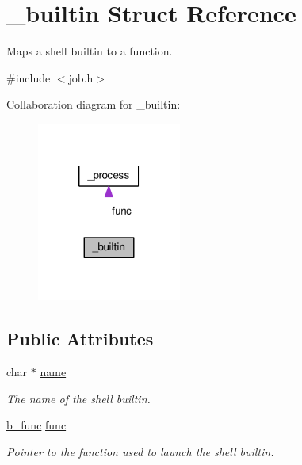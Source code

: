 \hypertarget{struct__builtin}{\section{\-\_\-builtin Struct Reference}
\label{struct__builtin}
}


Maps a shell builtin to a function.  




{\ttfamily \#include $<$job.\-h$>$}



Collaboration diagram for \-\_\-builtin\-:\nopagebreak
\begin{figure}[H]
\begin{center}
\leavevmode
\includegraphics[width=134pt]{struct__builtin__coll__graph}
\end{center}
\end{figure}
\subsection*{Public Attributes}
\begin{DoxyCompactItemize}
\item 
char $\ast$ \hyperlink{struct__builtin_adfb6bdcbe370c381dcb71f91fcc65319}{name}
\begin{DoxyCompactList}\small\item\em The name of the shell builtin. \end{DoxyCompactList}\item 
\hyperlink{job_8h_af6b8d1779250c4d2f3c902dc1aad5a5d}{b\-\_\-func} \hyperlink{struct__builtin_adb30d358f5fb6b16dc124796851e0c48}{func}
\begin{DoxyCompactList}\small\item\em Pointer to the function used to launch the shell builtin. \end{DoxyCompactList}\end{DoxyCompactItemize}


